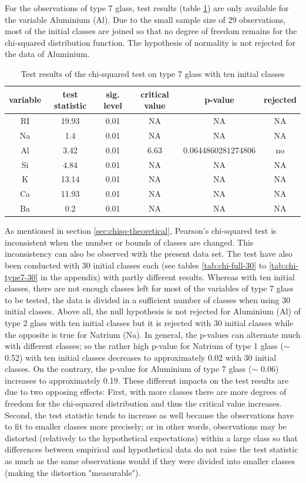 \documentclass[a4paper, 12pt, titlepage, headsepline, listof = totoc, bibliography = totoc, numbers = noenddot]{scrartcl}
\begin{document}
For the observations of type 7 glass, test results (table \ref{tab:chi-type7}) are only available for the variable Aluminium (Al). Due to the small sample size of 29 observations, most of the initial classes are joined so that no degree of freedom remains for the chi-squared distribution function. The hypothesis of normality is not rejected for the data of Aluminium.

\begin{table}[h!]
\centering
\begin{tabular}{|cccccc|} \hline variable & test statistic & sig. level & critical value & p-value & rejected\\ \hline RI & 19.93 & 0.01 & NA & NA & NA\\ 
Na & 1.4 & 0.01 & NA & NA & NA\\ 
Al & 3.42 & 0.01 & 6.63 & 0.0644860281274806 & no\\ 
Si & 4.84 & 0.01 & NA & NA & NA\\ 
K & 13.14 & 0.01 & NA & NA & NA\\ 
Ca & 11.93 & 0.01 & NA & NA & NA\\ 
Ba & 0.2 & 0.01 & NA & NA & NA\\ \hline \end{tabular}\caption{Test results of the chi-squared test on type 7 glass with ten initial classes}
\label{tab:chi-type7}
\end{table}

As mentioned in section \ref{sec:chisq-theoretical}, Pearson's chi-squared test is inconsistent when the number or bounds of classes are changed. This inconsistency can also be observed with the present data set. The test have also been conducted with 30 initial classes each (see tables \ref{tab:chi-full-30} to \ref{tab:chi-type7-30} in the appendix) with partly different results. Whereas with ten initial classes, there are not enough classes left for most of the variables of type 7 glass to be tested, the data is divided in a sufficient number of classes when using 30 initial classes. Above all, the null hypothesis is not rejected for Aluminium (Al) of type 2 glass with ten initial classes but it is rejected with 30 initial classes while the opposite is true for Natrium (Na). In general, the p-values can alternate much with different classes; so the rather high p-value for Natrium of type 1 glass ($\sim$ 0.52) with ten initial classes decreases to approximately 0.02 with 30 initial classes. On the contrary, the p-value for Aluminium of type 7 glass ($\sim$ 0.06) increases to approximately 0.19. These different impacts on the test results are due to two opposing effects: First, with more classes there are more degrees of freedom for the chi-squared distribution and thus the critical value increases. Second, the test statistic tends to increase as well because the observations have to fit to smaller classes more precisely; or in other words, observations may be distorted (relatively to the hypothetical expectations) within a large class so that differences between empirical and hypothetical data do not raise the test statistic as much as the same observations would if they were divided into smaller classes (making the distortion "measurable").
\end{document}
